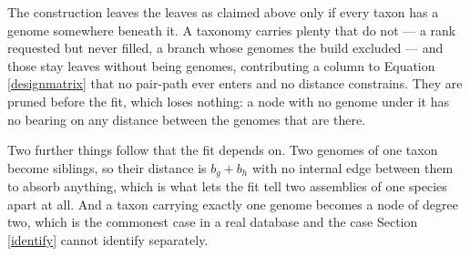 \documentclass[pdflatex,sn-vancouver-num]{sn-jnl}
\begin{document}
The construction leaves the leaves as claimed above only if every taxon has a genome somewhere
beneath it. A taxonomy carries plenty that do not --- a rank requested but never filled, a branch
whose genomes the build excluded --- and those stay leaves without being genomes, contributing a
column to Equation \eqref{designmatrix} that no pair-path ever enters and no distance constrains.
They are pruned before the fit, which loses nothing: a node with no genome under it has no bearing on
any distance between the genomes that are there.

Two further things follow that the fit depends on. Two genomes of one taxon become siblings, so their
distance is $b_g + b_h$ with no internal edge between them to absorb anything, which is what lets the
fit tell two assemblies of one species apart at all. And a taxon carrying exactly one genome becomes
a node of degree two, which is the commonest case in a real database and the case
Section \ref{identify} cannot identify separately.
\end{document}
